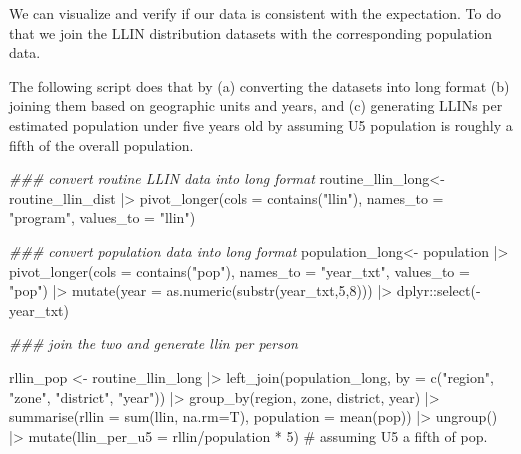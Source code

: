 \documentclass[
  letterpaper,
  DIV=11,
  numbers=noendperiod]{scrreprt}
\newenvironment{Shaded}{\begin{snugshade}}{\end{snugshade}}
\newcommand{\AttributeTok}[1]{\textcolor[rgb]{0.40,0.45,0.13}{#1}}
\newcommand{\CommentTok}[1]{\textcolor[rgb]{0.37,0.37,0.37}{#1}}
\newcommand{\DecValTok}[1]{\textcolor[rgb]{0.68,0.00,0.00}{#1}}
\newcommand{\DocumentationTok}[1]{\textcolor[rgb]{0.37,0.37,0.37}{\textit{#1}}}
\newcommand{\FunctionTok}[1]{\textcolor[rgb]{0.28,0.35,0.67}{#1}}
\newcommand{\NormalTok}[1]{\textcolor[rgb]{0.00,0.23,0.31}{#1}}
\newcommand{\OtherTok}[1]{\textcolor[rgb]{0.00,0.23,0.31}{#1}}
\newcommand{\SpecialCharTok}[1]{\textcolor[rgb]{0.37,0.37,0.37}{#1}}
\newcommand{\StringTok}[1]{\textcolor[rgb]{0.13,0.47,0.30}{#1}}
\begin{document}
We can visualize and verify if our data is consistent with the
expectation. To do that we join the LLIN distribution datasets with the
corresponding population data.

The following script does that by (a) converting the datasets into long
format (b) joining them based on geographic units and years, and (c)
generating LLINs per estimated population under five years old by
assuming U5 population is roughly a fifth of the overall population.

\begin{Shaded}
\begin{Highlighting}[]
\DocumentationTok{\#\#\# convert routine LLIN data into long format}
\NormalTok{routine\_llin\_long}\OtherTok{\textless{}{-}}\NormalTok{ routine\_llin\_dist }\SpecialCharTok{|\textgreater{}}
  \FunctionTok{pivot\_longer}\NormalTok{(}\AttributeTok{cols =} \FunctionTok{contains}\NormalTok{(}\StringTok{"llin"}\NormalTok{),}
               \AttributeTok{names\_to =} \StringTok{"program"}\NormalTok{,}
               \AttributeTok{values\_to =} \StringTok{"llin"}\NormalTok{)}

\DocumentationTok{\#\#\# convert population data into long format}
\NormalTok{population\_long}\OtherTok{\textless{}{-}}\NormalTok{ population }\SpecialCharTok{|\textgreater{}}
  \FunctionTok{pivot\_longer}\NormalTok{(}\AttributeTok{cols =} \FunctionTok{contains}\NormalTok{(}\StringTok{"pop"}\NormalTok{),}
               \AttributeTok{names\_to =} \StringTok{"year\_txt"}\NormalTok{, }
               \AttributeTok{values\_to =} \StringTok{"pop"}\NormalTok{) }\SpecialCharTok{|\textgreater{}}
  \FunctionTok{mutate}\NormalTok{(}\AttributeTok{year =} \FunctionTok{as.numeric}\NormalTok{(}\FunctionTok{substr}\NormalTok{(year\_txt,}\DecValTok{5}\NormalTok{,}\DecValTok{8}\NormalTok{))) }\SpecialCharTok{|\textgreater{}}
\NormalTok{  dplyr}\SpecialCharTok{::}\FunctionTok{select}\NormalTok{(}\SpecialCharTok{{-}}\NormalTok{year\_txt)}


\DocumentationTok{\#\#\# join the two and generate llin per person}

\NormalTok{rllin\_pop }\OtherTok{\textless{}{-}}\NormalTok{   routine\_llin\_long }\SpecialCharTok{|\textgreater{}}
  \FunctionTok{left\_join}\NormalTok{(population\_long,}
            \AttributeTok{by =} \FunctionTok{c}\NormalTok{(}\StringTok{"region"}\NormalTok{,}
                   \StringTok{"zone"}\NormalTok{,}
                   \StringTok{"district"}\NormalTok{,}
                   \StringTok{"year"}\NormalTok{)) }\SpecialCharTok{|\textgreater{}}
  \FunctionTok{group\_by}\NormalTok{(region, zone, district, year) }\SpecialCharTok{|\textgreater{}}
  \FunctionTok{summarise}\NormalTok{(}\AttributeTok{rllin =} \FunctionTok{sum}\NormalTok{(llin, }\AttributeTok{na.rm=}\NormalTok{T),}
            \AttributeTok{population =} \FunctionTok{mean}\NormalTok{(pop)) }\SpecialCharTok{|\textgreater{}}
  \FunctionTok{ungroup}\NormalTok{() }\SpecialCharTok{|\textgreater{}}
  \FunctionTok{mutate}\NormalTok{(}\AttributeTok{llin\_per\_u5  =}\NormalTok{ rllin}\SpecialCharTok{/}\NormalTok{population }\SpecialCharTok{*} \DecValTok{5}\NormalTok{)  }\CommentTok{\# assuming U5 a fifth of pop.}
\end{Highlighting}
\end{Shaded}
\end{document}
